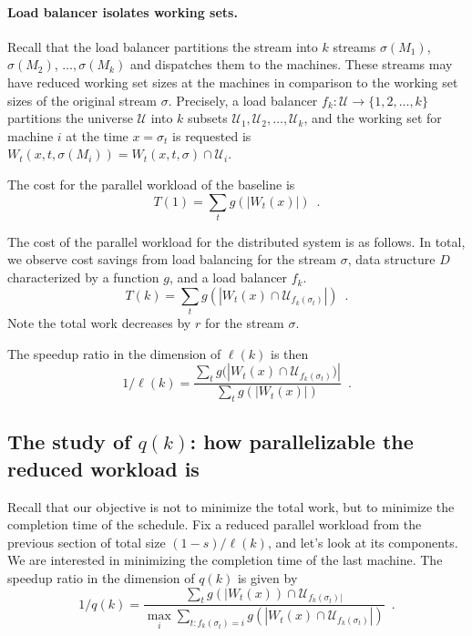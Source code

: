 \paragraph*{Load balancer isolates working sets.}
Recall that the load balancer partitions the stream into $k$ streams $\sigma(M_1)$, $\sigma(M_2)$, $\ldots, \sigma(M_k)$ and dispatches them to the machines.
These streams may have reduced working set sizes at the machines in comparison to the working set sizes of the original stream $\sigma$.
Precisely, a load balancer $f_k : \mathcal{U} \to \{1, 2, \ldots, k\}$ partitions the universe $\mathcal{U}$ into $k$ subsets $\mathcal{U}_1, \mathcal{U}_2, \ldots, \mathcal{U}_k$, and the working set for machine $i$ at the time $x = \sigma_t$ is requested is $W_t(x, t, \sigma(M_i)) = W_t(x, t, \sigma) \cap \mathcal{U}_i$.

The cost for the parallel workload of the baseline is 
\[
	T(1) = \sum_{t} g(|W_t(x)|)\enspace .
\]


The cost of the parallel workload for the distributed system is as follows.
In total, we observe cost savings from load balancing for the stream $\sigma$, data structure $D$ characterized by a function $g$, and a load balancer $f_k$.
\[
	T(k) = \sum_{t} g(|W_t(x) \cap \mathcal{U}_{f_k(\sigma_t)}|) \enspace .
\]
Note the total work decreases by $r$ for the stream $\sigma$.

The speedup ratio in the dimension of $\ell(k)$ is then 
\[
	1/\ell(k) = \frac{\sum_{t} g(|W_t(x) \cap \mathcal{U}_{f_k(\sigma_t)})|}{\sum_{t} g(|W_t(x)|)}  \enspace .
\]



\subsection{The study of $q(k)$: how parallelizable the reduced workload is}

Recall that our objective is not to minimize the total work, but to minimize the completion time of the schedule.
Fix a reduced parallel workload from the previous section of total size $(1-s)/\ell(k)$, and let's look at its components.
We are interested in minimizing the completion time of the last machine. 
The speedup ratio in the dimension of $q(k)$ is given by
\[
	1/q(k) = \frac{\sum_{t} g(|W_t(x)) \cap \mathcal{U}_{f_k(\sigma_t)|}}{\max_i \sum_{t : f_k(\sigma_t) = i} g(|W_t(x) \cap \mathcal{U}_{f_k(\sigma_t)}|)}  \enspace .
\]




